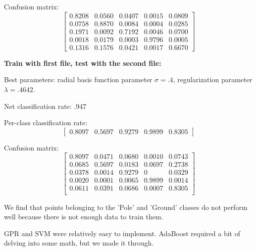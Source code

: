 \documentclass[letterpaper]{article}
\begin{document}
Confusion matrix:
$$\begin{bmatrix}
0.8208 &   0.0560  & 0.0407 &   0.0015  &  0.0809\\
    0.0758&    0.8870 &   0.0084&    0.0004 &   0.0285\\
    0.1971   & 0.0092   & 0.7192  &  0.0046   & 0.0700\\
    0.0018   & 0.0179    &0.0003  &  0.9796  &  0.0005\\
    0.1316   &0.1576    &0.0421  &  0.0017  &  0.6670
\end{bmatrix}$$

\textbf{Train with first file, test with the second file:}

Best parameters: radial basis function parameter $\sigma=.4$, regularization parameter $\lambda=.4642$.

Net classification rate: .947

Per-class classification rate: 
$$\begin{bmatrix}0.8097  &  0.5697   & 0.9279   & 0.9899  &  0.8305\end{bmatrix}$$

Confusion matrix:
$$\begin{bmatrix}
0.8097&    0.0471&    0.0680  &  0.0010  &  0.0743\\
    0.0685&    0.5697&    0.0183&    0.0697  &  0.2738\\
    0.0378   & 0.0014&    0.9279  &       0 &   0.0329\\
    0.0020 &   0.0001 &   0.0065 &   0.9899  &  0.0014\\
    0.0611   & 0.0391  &  0.0686  &  0.0007&    0.8305\\
\end{bmatrix}$$

We find that points belonging to the 'Pole' and 'Ground' classes do not perform well
because there is not enough data to train them.

GPR and SVM were relatively easy to implement. AdaBoost required a bit of delving into some math, but 
we made it through.
\end{document}

